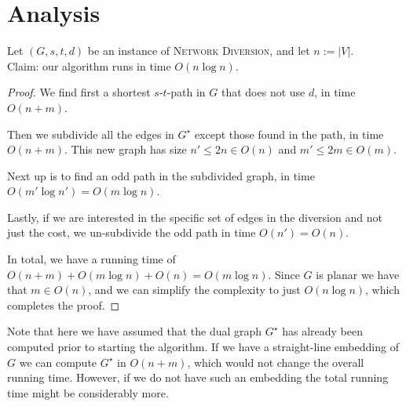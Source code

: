\section{Analysis}


\begin{theorem}
    Let $(G, s, t, d)$ be an instance of \textsc{Network Diversion}, and let $n := |V|$. \\
    Claim: our algorithm runs in time $O(n \log n)$.
    
    \begin{proof}
        We find first a shortest $s$-$t$-path in $G$ that does not use $d$, in time $O(n+m)$.
    
        Then we subdivide all the edges in $G^\star$ except those found in the path, in time $O(n+m)$. This new graph has size $n' \leq 2n \in O(n)$ and $m' \leq 2m \in O(m)$.
    
        Next up is to find an odd path in the subdivided graph, in time $O(m' \log n') = O(m \log n)$.
    
        Lastly, if we are interested in the specific set of edges in the diversion and not just the cost, we un-subdivide the odd path in time $O(n') = O(n)$.
    
        In total, we have a running time of $O(n+m) + O(m \log n) + O(n) = O(m \log n)$. Since $G$ is planar we have that $m \in O(n)$, and we can simplify the complexity to just $O(n \log n)$, which completes the proof.
    \end{proof}
\end{theorem}

Note that here we have assumed that the dual graph $G^\star$ has already been computed prior to starting the algorithm. If we have a straight-line embedding of $G$ we can compute $G^\star$ in $O(n+m)$, which would not change the overall running time. However, if we do not have such an embedding the total running time might be considerably more.


